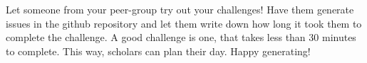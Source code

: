 \begin{challenge}
    \begin{advice}
        Let someone from your peer-group try out your challenges!
        Have them generate issues in the github repository and let them write down how long it took them to complete the challenge.
        A good challenge is one, that takes less than 30 minutes to complete.
        This way, scholars can plan their day.
        Happy generating!
    \end{advice}
\end{challenge}
